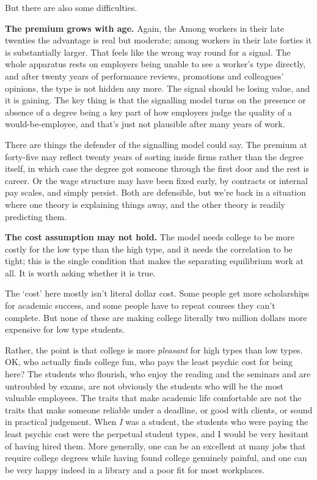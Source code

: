 \documentclass[
  11pt,
  letterpaper,
]{scrbook}
\newcounter{none} %
\begin{document}
But there are also some difficulties.

\textbf{The premium grows with age.} Again, the Among workers in their
late twenties the advantage is real but moderate; among workers in their
late forties it is substantially larger. That feels like the wrong way
round for a signal. The whole apparatus rests on employers being unable
to see a worker's type directly, and after twenty years of performance
reviews, promotions and colleagues' opinions, the type is not hidden any
more. The signal should be losing value, and it is gaining. The key
thing is that the signalling model turns on the presence or absence of a
degree being a key part of how employers judge the quality of a
would-be-employee, and that's just not plausible after many years of
work.

There are things the defender of the signalling model could say. The
premium at forty-five may reflect twenty years of sorting inside firms
rather than the degree itself, in which case the degree got someone
through the first door and the rest is career. Or the wage structure may
have been fixed early, by contracts or internal pay scales, and simply
persist. Both are defensible, but we're back in a situation where one
theory is explaining things away, and the other theory is readily
predicting them.

\textbf{The cost assumption may not hold.} The model needs college to be
more costly for the low type than the high type, and it needs the
correlation to be tight; this is the single condition that makes the
separating equilibrium work at all. It is worth asking whether it is
true.

The `cost' here mostly isn't literal dollar cost. Some people get more
scholarships for academic success, and some people have to repeat
courses they can't complete. But none of these are making college
literally two million dollars more expensive for low type students.

Rather, the point is that college is more \emph{pleasant} for high types
than low types. OK, who actually finds college fun, who pays the least
psychic cost for being here? The students who flourish, who enjoy the
reading and the seminars and are untroubled by exams, are not obviously
the students who will be the most valuable employees. The traits that
make academic life comfortable are not the traits that make someone
reliable under a deadline, or good with clients, or sound in practical
judgement. When \emph{I} was a student, the students who were paying the
least psychic cost were the perpetual student types, and I would be very
hesitant of having hired them. More generally, one can be an excellent
at many jobs that require college degrees while having found college
genuinely painful, and one can be very happy indeed in a library and a
poor fit for most workplaces.
\end{document}
